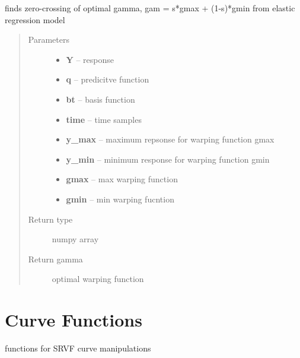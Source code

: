 \documentclass[letterpaper,10pt,english]{sphinxmanual}
\begin{document}
\begin{fulllineitems}
\label{utility_functions:utility_functions.zero_crossing}
finds zero-crossing of optimal gamma, gam = s*gmax + (1-s)*gmin
from elastic regression model
\begin{quote}\begin{description}
\item[{Parameters}] \leavevmode\begin{itemize}
\item {} 
\textbf{Y} -- response

\item {} 
\textbf{q} -- predicitve function

\item {} 
\textbf{bt} -- basis function

\item {} 
\textbf{time} -- time samples

\item {} 
\textbf{y\_max} -- maximum repsonse for warping function gmax

\item {} 
\textbf{y\_min} -- minimum response for warping function gmin

\item {} 
\textbf{gmax} -- max warping function

\item {} 
\textbf{gmin} -- min warping fucntion

\end{itemize}

\item[{Return type}] \leavevmode
numpy array

\item[{Return gamma}] \leavevmode
optimal warping function

\end{description}\end{quote}

\end{fulllineitems}



\chapter{Curve Functions}
\label{curve_functions:curve-functions}\label{curve_functions::doc}\label{curve_functions:module-curve_functions}
functions for SRVF curve manipulations
\end{document}
